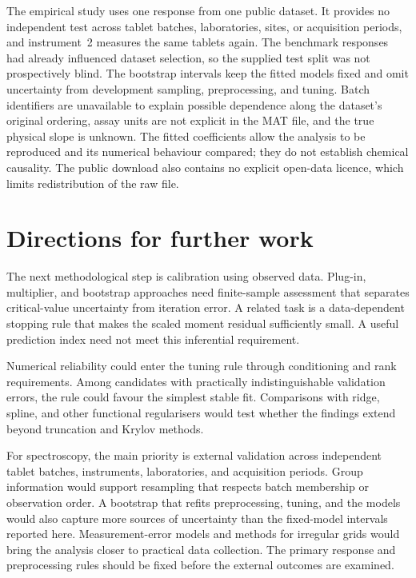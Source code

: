 The empirical study uses one response from one public dataset.  It provides no
independent test across tablet batches, laboratories, sites, or acquisition
periods, and instrument~2 measures the same tablets again.  The benchmark
responses had already influenced dataset selection, so the supplied test
split was not prospectively blind.  The bootstrap intervals keep the fitted
models fixed and omit uncertainty from development sampling, preprocessing,
and tuning.  Batch identifiers are unavailable to explain possible dependence
along the dataset's original ordering, assay units are not explicit in the MAT
file, and the true physical slope is unknown.  The fitted coefficients allow
the analysis to be reproduced and its numerical behaviour compared; they do
not establish chemical causality.  The public download also contains no
explicit open-data licence, which limits redistribution of the raw file.

\section{Directions for further work}
\label{sec:conclusion-future-work}

The next methodological step is calibration using observed data.  Plug-in,
multiplier, and bootstrap approaches need finite-sample assessment that
separates critical-value uncertainty from iteration error.  A related task is
a data-dependent stopping rule that makes the scaled moment residual
sufficiently small.  A useful prediction index need not meet this inferential
requirement.

Numerical reliability could enter the tuning rule through conditioning and
rank requirements.  Among candidates with practically indistinguishable
validation errors, the rule could favour the simplest stable fit.  Comparisons
with ridge, spline, and other functional regularisers would test whether the
findings extend beyond truncation and Krylov methods.

For spectroscopy, the main priority is external validation across independent
tablet batches, instruments, laboratories, and acquisition periods.  Group
information would support resampling that respects batch membership or
observation order.  A bootstrap that refits preprocessing, tuning, and the
models would also capture more sources of uncertainty than the fixed-model
intervals reported here.  Measurement-error models and methods for irregular
grids would bring the analysis closer to practical data collection.  The
primary response and preprocessing rules should be fixed before the external
outcomes are examined.

